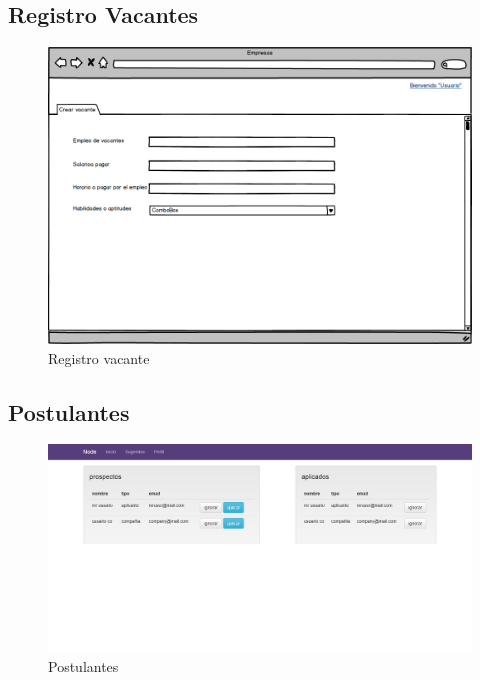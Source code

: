 \subsection{Registro Vacantes}
\begin{figure}[h]
\begin{center}
	\includegraphics[scale=0.40]{./resources/13revacante.png}
	\caption{Registro vacante}
	\label{fig:reca}
\end{center}
\end{figure}


\newpage 
\subsection{Postulantes}
\begin{figure}[h]
\begin{center}
	\includegraphics[scale=0.40]{./resources/vistas/inicio.png}
	\caption{Postulantes}
	\label{fig:apli}
\end{center}
\end{figure}


